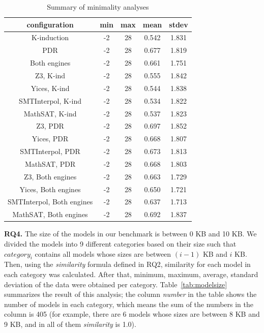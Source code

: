 \begin{table}
  \centering
  \begin{tabular}{|c|c|c|c|c|}
     \hline
     configuration & min & max & mean & stdev \\[0.5ex]
     \hline\hline
     K-induction & -2 & 28 & 0.542 & 1.831 \\[0.5ex]
     PDR & -2 & 28 & 0.677 & 1.819 \\[0.5ex]
     Both engines & -2 & 28 & 0.661 & 1.751 \\[0.5ex]
     \hline
     Z3, K-ind & -2 & 28 & 0.555 & 1.842 \\[0.5ex]
     Yices, K-ind & -2 & 28 & 0.544 & 1.838 \\[0.5ex]
     SMTInterpol, K-ind & -2 & 28 & 0.534 & 1.822 \\[0.5ex]
     MathSAT, K-ind & -2 & 28 & 0.537 & 1.823 \\[0.5ex]
     \hline
     Z3, PDR & -2 & 28 & 0.697 & 1.852 \\[0.5ex]
     Yices, PDR & -2 & 28 & 0.668 & 1.807 \\[0.5ex]
     SMTInterpol, PDR & -2 & 28 & 0.673 & 1.813 \\[0.5ex]
     MathSAT, PDR & -2 & 28 & 0.668 & 1.803 \\[0.5ex]
     \hline
     Z3, Both engines & -2 & 28 & 0.663 & 1.729 \\[0.5ex]
     Yices, Both engines & -2 & 28 & 0.650 & 1.721 \\[0.5ex]
     SMTInterpol, Both engines & -2 & 28 & 0.637 & 1.713 \\[0.5ex]
     MathSAT, Both engines & -2 & 28 & 0.692 & 1.837 \\[0.5ex]
     \hline
   \end{tabular}
  \caption{\small{Summary of minimality analyses}}\label{tab:minimality}
\end{table}

\vspace{6pt}
\noindent{}
 \vspace{9pt}

\textbf{RQ4.} The size of the models in our benchmark is between 0 KB and 10 KB.
We divided the models into 9 different categories based on their size such that $category_i$ contains
all models whose sizes are between $(i - 1)$ KB and $i$ KB. Then, using the \textit{similarity} formula defined in RQ2, similarity for each model in each category was calculated. After that, minimum, maximum, average, standard deviation of the data were obtained per category. Table~\ref{tab:modelsize} summarizes the result of this analysis; the column \emph{number} in the table shows the number of models in each category, which means the sum of the numbers in the column is 405 (for example, there are 6 models whose sizes are between 8 KB and 9 KB, and in all of them \textit{similarity} is 1.0).


